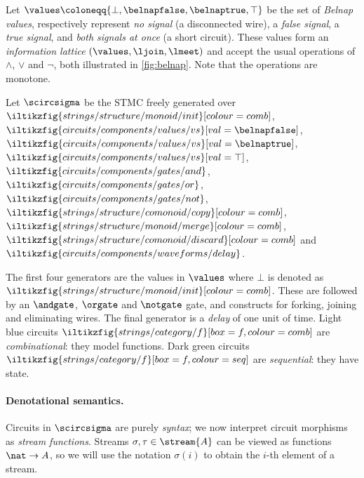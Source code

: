 \documentclass[10pt]{article}
\begin{document}
\begin{definition}
    Let \(\values \coloneqq \{\bot,\belnapfalse,\belnaptrue,\top\}\) be the set
    of \emph{Belnap values}, respectively represent \emph{no signal}
    (a disconnected wire), a \emph{false signal}, a \emph{true signal}, and
    \emph{both signals at once} (a short circuit).
    These values form an \emph{information lattice} \((\values,\ljoin,\lmeet)\)
    and accept the usual operations of \(\land\), \(\lor\) and \(\neg\), both
    illustrated in \cref{fig:belnap}.
    Note that the operations are monotone.
\end{definition}

\begin{definition}
    Let \(\scircsigma\) be the STMC freely generated over \(
    \iltikzfig{strings/structure/monoid/init}[colour=comb]
    \), \(
    \iltikzfig{circuits/components/values/vs}[val=\belnapfalse]
    \), \(
    \iltikzfig{circuits/components/values/vs}[val=\belnaptrue]
    \), \(
    \iltikzfig{circuits/components/values/vs}[val=\top]
    \), \(
    \iltikzfig{circuits/components/gates/and}
    \), \(
    \iltikzfig{circuits/components/gates/or}
    \), \(
    \iltikzfig{circuits/components/gates/not}
    \), \(
    \iltikzfig{strings/structure/comonoid/copy}[colour=comb]
    \), \(
    \iltikzfig{strings/structure/monoid/merge}[colour=comb]
    \), \(
    \iltikzfig{strings/structure/comonoid/discard}[colour=comb]
    \) and \(
    \iltikzfig{circuits/components/waveforms/delay}
    \).
\end{definition}

The first four generators are the values in \(\values\) where \(\bot\)
is denoted as \(\iltikzfig{strings/structure/monoid/init}[colour=comb]\).
These are followed by an \(\andgate\), \(\orgate\) and \(\notgate\) gate, and
constructs for forking, joining and eliminating wires.
The final generator is a \emph{delay} of one unit of time.
Light blue circuits \(
\iltikzfig{strings/category/f}[box=f,colour=comb]
\)  are \emph{combinational}: they model functions.
Dark green circuits \(
\iltikzfig{strings/category/f}[box=f,colour=seq]
\) are \emph{sequential}: they have state.

\paragraph*{Denotational semantics.}

Circuits in \(\scircsigma\) are purely \emph{syntax}; we now interpret circuit
morphisms as \emph{stream functions}.
Streams \(\sigma,\tau \in \stream{A}\) can be viewed as functions
\(\nat \to A\), so we will use the notation \(\sigma(i)\) to obtain the \(i\)-th
element of a stream.
\end{document}
